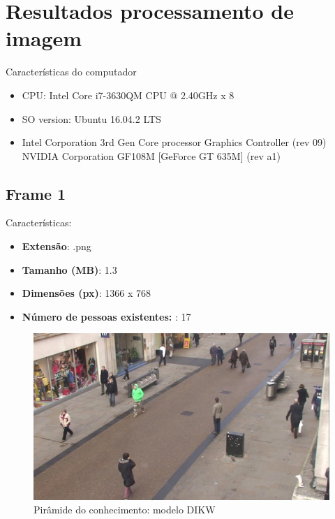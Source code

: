 \chapter{Resultados processamento de imagem }

Características do computador 
\begin{itemize}
	\item CPU: Intel Core i7-3630QM CPU @ 2.40GHz x 8
	\item SO version: Ubuntu 16.04.2 LTS
	\item Intel Corporation 3rd Gen Core processor Graphics Controller (rev 09)
	NVIDIA Corporation GF108M [GeForce GT 635M] (rev a1)
\end{itemize}



\newpage
\section{Frame 1}


Características: 
\begin{itemize}
	\item \textbf{Extensão}: .png
	\item \textbf{Tamanho (MB)}: 1.3
	\item \textbf{Dimensões (px)}: 1366 x 768
	\item \textbf{Número de pessoas existentes: } : 17
\end{itemize}


\begin{figure}[!htb]
	\centering
	\includegraphics[width=\linewidth]{img/vision/frame1.png}
	\caption{Pirâmide do conhecimento: modelo DIKW}
	\label{db}
\end{figure}



